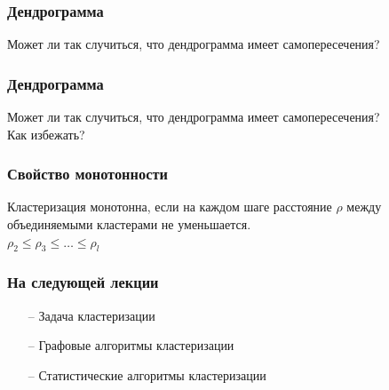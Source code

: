 \documentclass[12pt]{beamer}
\begin{document}
\begin{frame}\frametitle{Дендрограмма}
Может ли так случиться, что дендрограмма имеет самопересечения?
\end{frame}


\begin{frame}\frametitle{Дендрограмма}
Может ли так случиться, что дендрограмма имеет самопересечения?\\
\vspace{5mm}
Как избежать?
\end{frame}

\begin{frame}\frametitle{Свойство монотонности}
Кластеризация монотонна, если на каждом шаге расстояние $\rho$ между объединяемыми кластерами не уменьшается.\\
$\rho_2 \leq \rho_3 \leq \dots \leq \rho_l$
\end{frame}

\begin{frame}\frametitle{На следующей лекции}
\begin{itemize}
\item[--] Задача кластеризации
\item[--] Графовые алгоритмы кластеризации
\item[--] Статистические алгоритмы кластеризации
\end{itemize}
\end{frame}
\end{document}
